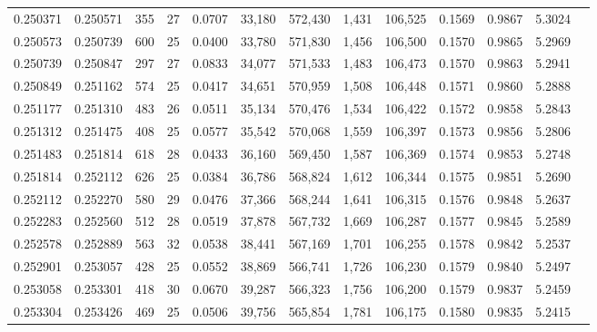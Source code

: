 \begin{tabular}{rrrrrrrrrrrrr}
0.250371 & 0.250571 &   355 &  27 &                                     0.0707 &  33,180 & 572,430 &   1,431 & 106,525 & 0.1569 & 0.9867 & 5.3024 \\
0.250573 & 0.250739 &   600 &  25 &                                     0.0400 &  33,780 & 571,830 &   1,456 & 106,500 & 0.1570 & 0.9865 & 5.2969 \\
0.250739 & 0.250847 &   297 &  27 &                                     0.0833 &  34,077 & 571,533 &   1,483 & 106,473 & 0.1570 & 0.9863 & 5.2941 \\
0.250849 & 0.251162 &   574 &  25 &                                     0.0417 &  34,651 & 570,959 &   1,508 & 106,448 & 0.1571 & 0.9860 & 5.2888 \\
0.251177 & 0.251310 &   483 &  26 &                                     0.0511 &  35,134 & 570,476 &   1,534 & 106,422 & 0.1572 & 0.9858 & 5.2843 \\
0.251312 & 0.251475 &   408 &  25 &                                     0.0577 &  35,542 & 570,068 &   1,559 & 106,397 & 0.1573 & 0.9856 & 5.2806 \\
0.251483 & 0.251814 &   618 &  28 &                                     0.0433 &  36,160 & 569,450 &   1,587 & 106,369 & 0.1574 & 0.9853 & 5.2748 \\
0.251814 & 0.252112 &   626 &  25 &                                     0.0384 &  36,786 & 568,824 &   1,612 & 106,344 & 0.1575 & 0.9851 & 5.2690 \\
0.252112 & 0.252270 &   580 &  29 &                                     0.0476 &  37,366 & 568,244 &   1,641 & 106,315 & 0.1576 & 0.9848 & 5.2637 \\
0.252283 & 0.252560 &   512 &  28 &                                     0.0519 &  37,878 & 567,732 &   1,669 & 106,287 & 0.1577 & 0.9845 & 5.2589 \\
0.252578 & 0.252889 &   563 &  32 &                                     0.0538 &  38,441 & 567,169 &   1,701 & 106,255 & 0.1578 & 0.9842 & 5.2537 \\
0.252901 & 0.253057 &   428 &  25 &                                     0.0552 &  38,869 & 566,741 &   1,726 & 106,230 & 0.1579 & 0.9840 & 5.2497 \\
0.253058 & 0.253301 &   418 &  30 &                                     0.0670 &  39,287 & 566,323 &   1,756 & 106,200 & 0.1579 & 0.9837 & 5.2459 \\
0.253304 & 0.253426 &   469 &  25 &                                     0.0506 &  39,756 & 565,854 &   1,781 & 106,175 & 0.1580 & 0.9835 & 5.2415 \\

\end{tabular}
